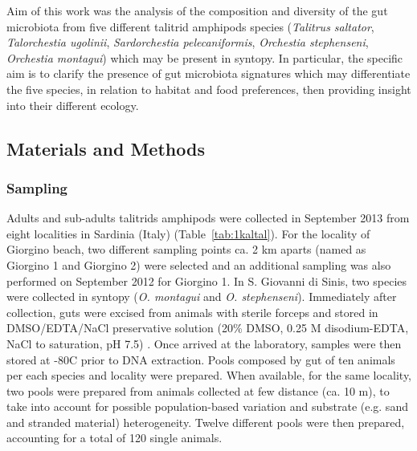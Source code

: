 Aim of this work was the analysis of the composition and diversity of the gut microbiota from five different talitrid amphipods species (\textit{Talitrus saltator}, \textit{Talorchestia ugolinii}, \textit{Sardorchestia pelecaniformis}, \textit{Orchestia stephenseni}, \textit{Orchestia montagui}) which may be present in syntopy. In particular, the specific aim is to clarify the presence of gut microbiota signatures which may differentiate the five species, in relation to habitat and food preferences, then providing insight into their different ecology.

\subsection{Materials and Methods\label{par:kalmatmet}}

\subsubsection{Sampling}
Adults and sub-adults talitrids amphipods were collected in September 2013 from eight localities in Sardinia (Italy) (Table~\ref{tab:1kaltal}). For the locality of Giorgino beach, two different sampling points ca. 2 km aparts (named as Giorgino 1 and Giorgino 2) were selected and an additional sampling was also performed on September 2012 for Giorgino 1. In S. Giovanni di Sinis, two species were collected in syntopy (\textit{O. montagui} and \textit{O. stephenseni}). Immediately after collection, guts were excised from animals with sterile forceps and stored in DMSO/EDTA/NaCl preservative solution (20\% DMSO, 0.25 M disodium-EDTA, NaCl to saturation, pH 7.5) \cite{seutin1991preservation, dawson1998field}. Once arrived at the laboratory, samples were then stored at -80{\textdegree}C prior to DNA extraction. Pools composed by gut of ten animals per each species and locality were prepared. When available, for the same locality, two pools were prepared from animals collected at few distance (ca. 10 m), to take into account for possible population-based variation and substrate (e.g. sand and stranded material) heterogeneity. Twelve different pools were then prepared, accounting for a total of 120 single animals.\\

